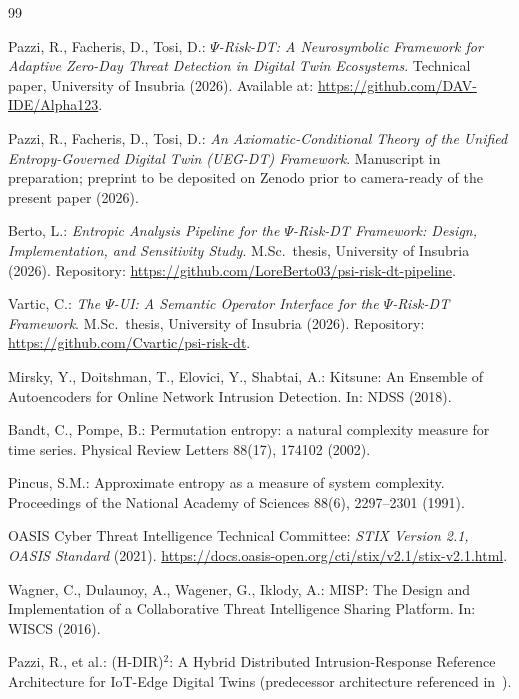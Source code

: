 \documentclass[runningheads]{llncs}
\newcommand{\psiop}{\ensuremath{\Psi}}
\begin{document}
\begin{thebibliography}{99}

Pazzi, R., Facheris, D., Tosi, D.:
\emph{$\psiop$-Risk-DT: A Neurosymbolic Framework for Adaptive Zero-Day
Threat Detection in Digital Twin Ecosystems}.
Technical paper, University of Insubria (2026).
Available at: \url{https://github.com/DAV-IDE/Alpha123}.

Pazzi, R., Facheris, D., Tosi, D.:
\emph{An Axiomatic-Conditional Theory of the Unified Entropy-Governed
Digital Twin (UEG-DT) Framework}.
Manuscript in preparation; preprint to be deposited on Zenodo prior to
camera-ready of the present paper (2026).

Berto, L.:
\emph{Entropic Analysis Pipeline for the $\psiop$-Risk-DT Framework:
Design, Implementation, and Sensitivity Study}.
M.Sc.\ thesis, University of Insubria (2026).
Repository: \url{https://github.com/LoreBerto03/psi-risk-dt-pipeline}.

Vartic, C.:
\emph{The $\psiop$-UI: A Semantic Operator Interface for the
$\psiop$-Risk-DT Framework}.
M.Sc.\ thesis, University of Insubria (2026).
Repository: \url{https://github.com/Cvartic/psi-risk-dt}.

Mirsky, Y., Doitshman, T., Elovici, Y., Shabtai, A.:
Kitsune: An Ensemble of Autoencoders for Online Network Intrusion
Detection. In: NDSS (2018).

Bandt, C., Pompe, B.:
Permutation entropy: a natural complexity measure for time series.
Physical Review Letters 88(17), 174102 (2002).

Pincus, S.M.:
Approximate entropy as a measure of system complexity.
Proceedings of the National Academy of Sciences 88(6),
2297--2301 (1991).

OASIS Cyber Threat Intelligence Technical Committee:
\emph{STIX Version 2.1, OASIS Standard} (2021).
\url{https://docs.oasis-open.org/cti/stix/v2.1/stix-v2.1.html}.

Wagner, C., Dulaunoy, A., Wagener, G., Iklody, A.:
MISP: The Design and Implementation of a Collaborative Threat
Intelligence Sharing Platform. In: WISCS (2016).

Pazzi, R., et al.:
(H-DIR)$^2$: A Hybrid Distributed Intrusion-Response Reference
Architecture for IoT-Edge Digital Twins (predecessor architecture
referenced in~\cite{paper3}).


\end{thebibliography}
\end{document}
